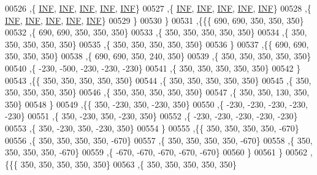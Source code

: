 \begin{DoxyCode}
00526    ,\{   \mbox{\hyperlink{energy__const_8h_a12c2040f25d8e3a7b9e1c2024c618cb6}{INF}},   \mbox{\hyperlink{energy__const_8h_a12c2040f25d8e3a7b9e1c2024c618cb6}{INF}},   \mbox{\hyperlink{energy__const_8h_a12c2040f25d8e3a7b9e1c2024c618cb6}{INF}},   \mbox{\hyperlink{energy__const_8h_a12c2040f25d8e3a7b9e1c2024c618cb6}{INF}},   \mbox{\hyperlink{energy__const_8h_a12c2040f25d8e3a7b9e1c2024c618cb6}{INF}}\}
00527    ,\{   \mbox{\hyperlink{energy__const_8h_a12c2040f25d8e3a7b9e1c2024c618cb6}{INF}},   \mbox{\hyperlink{energy__const_8h_a12c2040f25d8e3a7b9e1c2024c618cb6}{INF}},   \mbox{\hyperlink{energy__const_8h_a12c2040f25d8e3a7b9e1c2024c618cb6}{INF}},   \mbox{\hyperlink{energy__const_8h_a12c2040f25d8e3a7b9e1c2024c618cb6}{INF}},   \mbox{\hyperlink{energy__const_8h_a12c2040f25d8e3a7b9e1c2024c618cb6}{INF}}\}
00528    ,\{   \mbox{\hyperlink{energy__const_8h_a12c2040f25d8e3a7b9e1c2024c618cb6}{INF}},   \mbox{\hyperlink{energy__const_8h_a12c2040f25d8e3a7b9e1c2024c618cb6}{INF}},   \mbox{\hyperlink{energy__const_8h_a12c2040f25d8e3a7b9e1c2024c618cb6}{INF}},   \mbox{\hyperlink{energy__const_8h_a12c2040f25d8e3a7b9e1c2024c618cb6}{INF}},   \mbox{\hyperlink{energy__const_8h_a12c2040f25d8e3a7b9e1c2024c618cb6}{INF}}\}
00529    \}
00530   \}
00531  ,\{\{\{   690,   690,   350,   350,   350\}
00532    ,\{   690,   690,   350,   350,   350\}
00533    ,\{   350,   350,   350,   350,   350\}
00534    ,\{   350,   350,   350,   350,   350\}
00535    ,\{   350,   350,   350,   350,   350\}
00536    \}
00537   ,\{\{   690,   690,   350,   350,   350\}
00538    ,\{   690,   690,   350,   240,   350\}
00539    ,\{   350,   350,   350,   350,   350\}
00540    ,\{  -230,  -500,  -230,  -230,  -230\}
00541    ,\{   350,   350,   350,   350,   350\}
00542    \}
00543   ,\{\{   350,   350,   350,   350,   350\}
00544    ,\{   350,   350,   350,   350,   350\}
00545    ,\{   350,   350,   350,   350,   350\}
00546    ,\{   350,   350,   350,   350,   350\}
00547    ,\{   350,   350,   130,   350,   350\}
00548    \}
00549   ,\{\{   350,  -230,   350,  -230,   350\}
00550    ,\{  -230,  -230,  -230,  -230,  -230\}
00551    ,\{   350,  -230,   350,  -230,   350\}
00552    ,\{  -230,  -230,  -230,  -230,  -230\}
00553    ,\{   350,  -230,   350,  -230,   350\}
00554    \}
00555   ,\{\{   350,   350,   350,   350,  -670\}
00556    ,\{   350,   350,   350,   350,  -670\}
00557    ,\{   350,   350,   350,   350,  -670\}
00558    ,\{   350,   350,   350,   350,  -670\}
00559    ,\{  -670,  -670,  -670,  -670,  -670\}
00560    \}
00561   \}
00562  ,\{\{\{   350,   350,   350,   350,   350\}
00563    ,\{   350,   350,   350,   350,   350\}

\end{DoxyCode}

